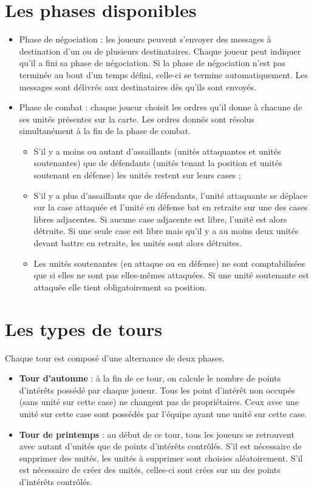 \section{Les phases disponibles}
	\begin{itemize}
		\item Phase de négociation : les joueurs peuvent s'envoyer des messages à destination d'un ou de plusieurs destinataires. Chaque joueur peut indiquer qu'il a fini sa phase de négociation. Si la phase de négociation n'est pas terminée au bout d'un temps défini, celle-ci se termine automatiquement. Les messages sont délivrés aux destinataires dès qu'ils sont envoyés.
		\item Phase de combat : chaque joueur choisit les ordres qu'il donne à chacune de ses unités présentes sur la carte. Les ordres donnés sont résolus simultanément à la fin de la phase de combat.
		\begin{itemize}
			\item S'il y a moins ou autant d'assaillants (unités attaquantes et unités soutenantes) que de défendants (unités tenant la position et unités soutenant en défense) les unités restent sur leurs cases ;
			\item S'il y a plus d'assaillants que de défendants, l'unité attaquante se déplace sur la case attaquée et l'unité en défense bat en retraite sur une des cases libres adjacentes. Si aucune case adjacente est libre, l'unité est alors détruite. Si une seule case est libre mais qu'il y a au moins deux unités devant battre en retraite, les unités sont alors détruites.
			\item Les unités soutenantes (en attaque ou en défense) ne sont comptabilisées que si elles ne sont pas elles-mêmes attaquées. Si une unité soutenante est attaquée elle tient obligatoirement sa position.
		\end{itemize}
	\end{itemize}

\section{Les types de tours}
	Chaque tour est composé d'une alternance de deux phases.
	\begin{itemize}
		\item \textbf{Tour d’automne} : à la fin de ce tour, on calcule le nombre de points d'intérêts possédé par chaque joueur. Tous les point d'intérêt non occupés (sans unité sur cette case) ne changent pas de propriétaires. Ceux avec une unité sur cette case sont possédés par l'équipe ayant une unité sur cette case.
		\item \textbf{Tour de printemps} : au début de ce tour, tous les joueurs se retrouvent avec autant d'unités que de points d'intérêts contrôlés. S'il est nécessaire de supprimer des unités, les unités à supprimer sont choisies aléatoirement. S'il est nécessaire de créer des unités, celles-ci sont crées sur un des points d'intérêts contrôlés.
	\end{itemize}

